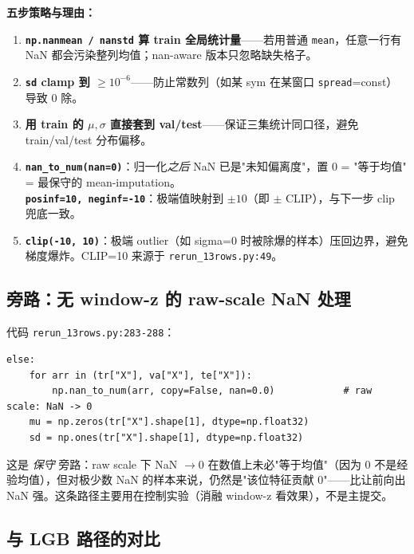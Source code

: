 \documentclass[10.5pt,a4paper]{article}
\begin{document}
\textbf{五步策略与理由：}
\begin{enumerate}[leftmargin=2em,itemsep=2pt,topsep=2pt]
  \item \textbf{\texttt{np.nanmean / nanstd} 算 train 全局统计量}——若用普通 \texttt{mean}，任意一行有 NaN 都会污染整列均值；nan-aware 版本只忽略缺失格子。
  \item \textbf{\texttt{sd} clamp 到 $\ge 10^{-6}$}——防止常数列（如某 sym 在某窗口 \texttt{spread}=const）导致 $0$ 除。
  \item \textbf{用 train 的 $\mu, \sigma$ 直接套到 val/test}——保证三集统计同口径，避免 train/val/test 分布偏移。
  \item \textbf{\texttt{nan\_to\_num(nan=0)}}：归一化\emph{之后} NaN 已是"未知偏离度"，置 0 = "等于均值" = 最保守的 mean-imputation。\\
        \textbf{\texttt{posinf=10, neginf=-10}}：极端值映射到 $\pm 10$（即 $\pm$ CLIP），与下一步 clip 兜底一致。
  \item \textbf{\texttt{clip(-10, 10)}}：极端 outlier（如 sigma=0 时被除爆的样本）压回边界，避免梯度爆炸。CLIP=10 来源于 \texttt{rerun\_13rows.py:49}。
\end{enumerate}

\subsection{旁路：无 window-z 的 raw-scale NaN 处理}

代码 \texttt{rerun\_13rows.py:283-288}：

\begin{lstlisting}
else:
    for arr in (tr["X"], va["X"], te["X"]):
        np.nan_to_num(arr, copy=False, nan=0.0)            # raw scale: NaN -> 0
    mu = np.zeros(tr["X"].shape[1], dtype=np.float32)
    sd = np.ones(tr["X"].shape[1], dtype=np.float32)
\end{lstlisting}

这是 \emph{保守} 旁路：raw scale 下 NaN $\to 0$ 在数值上未必"等于均值"（因为 0 不是经验均值），但对极少数 NaN 的样本来说，仍然是"该位特征贡献 0"——比让前向出 NaN 强。这条路径主要用在控制实验（消融 window-z 看效果），不是主提交。

\subsection{与 LGB 路径的对比}
\end{document}
